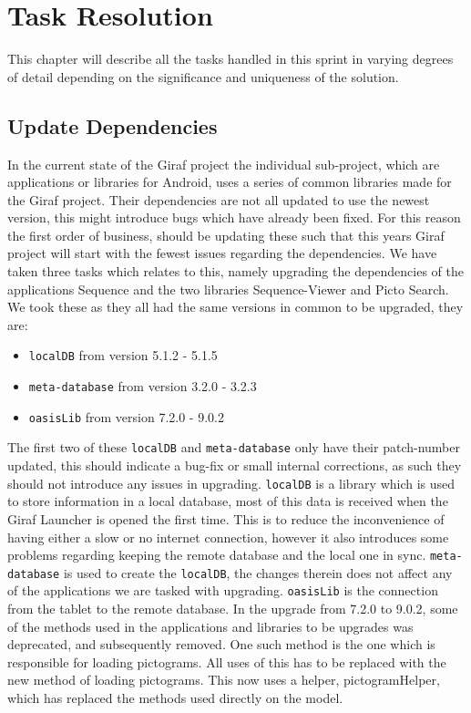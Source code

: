 \chapter{Task Resolution}
This chapter will describe all the tasks handled in this sprint in varying degrees of detail depending on the significance and uniqueness of the solution.

\section{Update Dependencies}
In the current state of the Giraf project the individual sub-project, which are applications or libraries for Android, uses a series of common libraries made for the Giraf project.
Their dependencies are not all updated to use the newest version, this might introduce bugs which have already been fixed.
For this reason the first order of business, should be updating these such that this years Giraf project will start with the fewest issues regarding the dependencies. 
We have taken three tasks which relates to this, namely upgrading the dependencies of the applications Sequence and the two libraries Sequence-Viewer and Picto Search.
We took these as they all had the same versions in common to be upgraded, they are:
\begin{itemize}
    \item \texttt{localDB} from version 5.1.2 - 5.1.5
    \item \texttt{meta-database} from version 3.2.0 - 3.2.3
    \item \texttt{oasisLib} from version 7.2.0 - 9.0.2
\end{itemize}
The first two of these \texttt{localDB} and \texttt{meta-database} only have their patch-number updated, this should indicate a bug-fix or small internal corrections, as such they should not introduce any issues in upgrading. 
\texttt{localDB} is a library which is used to store information in a local database, most of this data is received when the Giraf Launcher is opened the first time. 
This is to reduce the inconvenience of having either a slow or no internet connection, however it also introduces some problems regarding keeping the remote database and the local one in sync. 
\texttt{meta-database} is used to create the \texttt{localDB}, the changes therein does not affect any of the applications we are tasked with upgrading. \texttt{oasisLib} is the connection from the tablet to the remote database.
In the upgrade from 7.2.0 to 9.0.2, some of the methods used in the applications and libraries to be upgrades was deprecated, and subsequently removed. 
One such method is the one which is responsible for loading pictograms.
All uses of this has to be replaced with the new method of loading pictograms. 
This now uses a helper, pictogramHelper, which has replaced the methods used directly on the model. 

